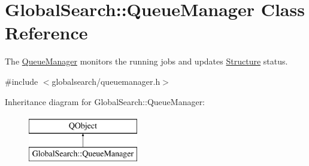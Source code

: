 \hypertarget{classGlobalSearch_1_1QueueManager}{}\section{Global\+Search\+:\+:Queue\+Manager Class Reference}
\label{classGlobalSearch_1_1QueueManager}


The \hyperlink{classGlobalSearch_1_1QueueManager}{Queue\+Manager} monitors the running jobs and updates \hyperlink{classGlobalSearch_1_1Structure}{Structure} status.  




{\ttfamily \#include $<$globalsearch/queuemanager.\+h$>$}

Inheritance diagram for Global\+Search\+:\+:Queue\+Manager\+:\begin{figure}[H]
\begin{center}
\leavevmode
\includegraphics[height=2.000000cm]{classGlobalSearch_1_1QueueManager}
\end{center}
\end{figure}

